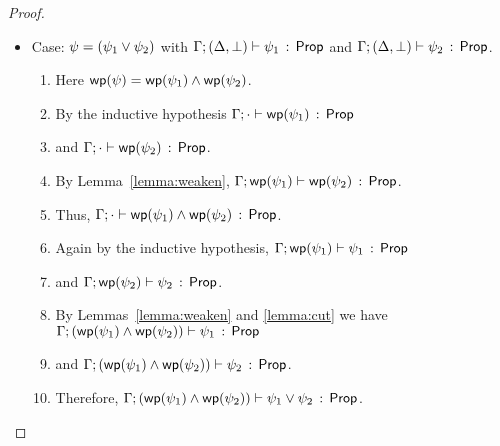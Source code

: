 \documentclass[11pt]{article}
\begin{document}
\begin{proof}
\begin{itemize}
  \item Case: $\psi = (\psi_1 \vee \psi_2)$ with
       $\Gamma;(\Delta,\bot) \vdash \psi_1\, :\, \mathsf{Prop}$ and 
              $\Gamma;(\Delta,\bot) \vdash \psi_2\, :\, \mathsf{Prop}$.
      	\begin{enumerate}
		\item
			Here $\mathop{\mathsf{wp}}(\psi) = \mathop{\mathsf{wp}}(\psi_1) \wedge \mathop{\mathsf{wp}}(\psi_2)$.
		\item
			By the inductive hypothesis
			$\Gamma;\cdot \vdash \mathop{\mathsf{wp}}(\psi_1)\, :\, \mathsf{Prop}$
		\item	
			and $\Gamma;\cdot \vdash \mathop{\mathsf{wp}}(\psi_2)\, :\, \mathsf{Prop}$.
		\item
		    By Lemma~\ref{lemma:weaken},
		    	$\Gamma;\mathop{\mathsf{wp}}(\psi_1) \vdash \mathop{\mathsf{wp}}(\psi_2)\, :\, \mathsf{Prop}$.
		\item
			Thus, 
			$\Gamma;\cdot \vdash \mathop{\mathsf{wp}}(\psi_1) \wedge \mathop{\mathsf{wp}}(\psi_2)\, :\, \mathsf{Prop}$.
		\item
			Again by the inductive hypothesis,
			$\Gamma;\mathop{\mathsf{wp}}(\psi_1) \vdash \psi_1\, :\, \mathsf{Prop}$
		\item
			and
			$\Gamma;\mathop{\mathsf{wp}}(\psi_2) \vdash \psi_2\, :\, \mathsf{Prop}$.
		\item
			By Lemmas~\ref{lemma:weaken} and \ref{lemma:cut} we have
			$\Gamma;(\mathop{\mathsf{wp}}(\psi_1) \wedge \mathop{\mathsf{wp}}(\psi_2)) \vdash \psi_1\, :\, \mathsf{Prop}$
		\item
			and
			$\Gamma;(\mathop{\mathsf{wp}}(\psi_1) \wedge \mathop{\mathsf{wp}}(\psi_2)) \vdash \psi_2\, :\, \mathsf{Prop}$.
		\item
			Therefore,
			$\Gamma;(\mathop{\mathsf{wp}}(\psi_1) \wedge \mathop{\mathsf{wp}}(\psi_2)) \vdash \psi_1 \vee \psi_2\, :\, \mathsf{Prop}$.
		\end{enumerate}    
      

\end{itemize}
\end{proof}
\end{document}
